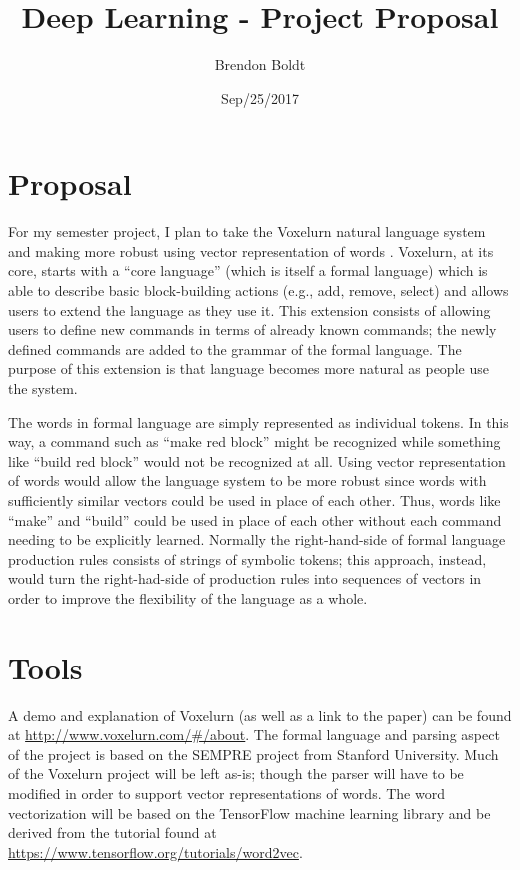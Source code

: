\documentclass[a4paper]{article}
\title{Deep Learning - Project Proposal}
\author{Brendon Boldt}
\date{Sep/25/2017}
\begin{document}


\maketitle

\section{Proposal}

For my semester project, I plan to take the Voxelurn natural language system
and making more robust using vector representation of words
\cite{DBLP:journals/corr/WangGLM17}
\cite{DBLP:journals/corr/abs-1301-3781}.
Voxelurn, at its core, starts with a ``core language'' (which is itself a formal
language) which is able to describe basic block-building actions
(e.g., add, remove, select) and allows users to extend the language as they use
it. This extension consists of allowing users to define new commands in terms
of already known commands; the newly defined commands are added to the grammar
of the formal language. The purpose of this extension is that language becomes
more natural as people use the system.

The words in formal language are simply represented as individual tokens.
In this way, a command such as ``make red block'' might be recognized while
something like ``build red block'' would not be recognized at all.
Using vector representation of words
would allow the language system to be more robust since words with
sufficiently similar vectors could be used in place of each other. Thus,
words like ``make'' and ``build'' could be used in place of each other
without each command needing to be explicitly learned.
Normally the right-hand-side of formal language production rules consists
of strings of symbolic tokens; this approach, instead, would turn the
right-had-side of production rules into sequences of vectors in order
to improve the flexibility of the language as a whole.

\section{Tools}

A demo and explanation of Voxelurn (as well as a link to the paper)
can be found at \url{http://www.voxelurn.com/#/about}. The formal
language and parsing aspect of the project is based on the SEMPRE
project from Stanford University. Much of the
Voxelurn project will be left as-is; though the parser will have
to be modified in order to support vector representations of words.
The word vectorization will be based on the TensorFlow machine
learning library and be derived from the tutorial found at 
\url{https://www.tensorflow.org/tutorials/word2vec}.
\end{document}
